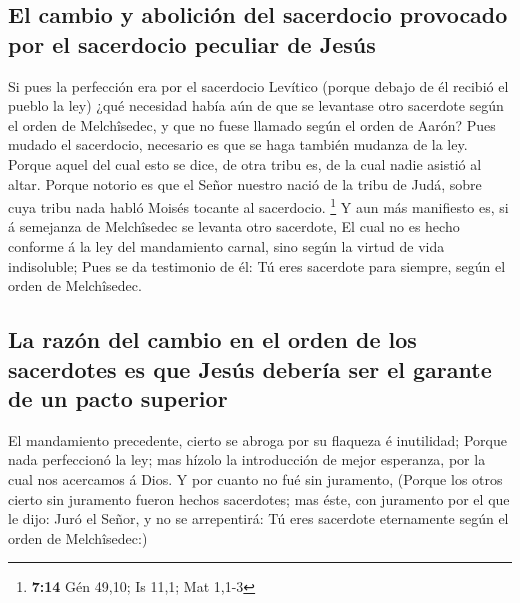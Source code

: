 \hypertarget{el-cambio-y-aboliciuxf3n-del-sacerdocio-provocado-por-el-sacerdocio-peculiar-de-jesuxfas}{%
\subsection{El cambio y abolición del sacerdocio provocado por el
sacerdocio peculiar de
Jesús}\label{el-cambio-y-aboliciuxf3n-del-sacerdocio-provocado-por-el-sacerdocio-peculiar-de-jesuxfas}}

 Si pues la perfección era por el sacerdocio Levítico
(porque debajo de él recibió el pueblo la ley) ¿qué necesidad había aún
de que se levantase otro sacerdote según el orden de Melchîsedec, y que
no fuese llamado según el orden de Aarón?  Pues mudado el
sacerdocio, necesario es que se haga también mudanza de la ley.
 Porque aquel del cual esto se dice, de otra tribu es, de
la cual nadie asistió al altar.  Porque notorio es que el
Señor nuestro nació de la tribu de Judá, sobre cuya tribu nada habló
Moisés tocante al sacerdocio. \footnote{\textbf{7:14} Gén 49,10; Is
  11,1; Mat 1,1-3}  Y aun más manifiesto es, si á semejanza
de Melchîsedec se levanta otro sacerdote,  El cual no es
hecho conforme á la ley del mandamiento carnal, sino según la virtud de
vida indisoluble;  Pues se da testimonio de él: Tú eres
sacerdote para siempre, según el orden de Melchîsedec.

\hypertarget{la-razuxf3n-del-cambio-en-el-orden-de-los-sacerdotes-es-que-jesuxfas-deberuxeda-ser-el-garante-de-un-pacto-superior}{%
\subsection{La razón del cambio en el orden de los sacerdotes es que
Jesús debería ser el garante de un pacto
superior}\label{la-razuxf3n-del-cambio-en-el-orden-de-los-sacerdotes-es-que-jesuxfas-deberuxeda-ser-el-garante-de-un-pacto-superior}}

 El mandamiento precedente, cierto se abroga por su
flaqueza é inutilidad;  Porque nada perfeccionó la ley; mas
hízolo la introducción de mejor esperanza, por la cual nos acercamos á
Dios.  Y por cuanto no fué sin juramento, 
(Porque los otros cierto sin juramento fueron hechos sacerdotes; mas
éste, con juramento por el que le dijo: Juró el Señor, y no se
arrepentirá: Tú eres sacerdote eternamente según el orden de
Melchîsedec:)

